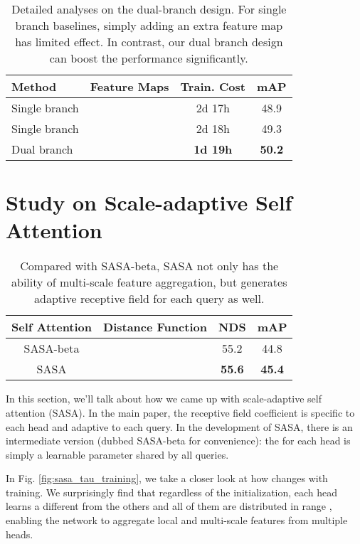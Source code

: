 \documentclass[10pt,twocolumn,letterpaper]{article}
\begin{document}
\begin{table}[t]
  \centering
  \begin{tabular}{l|c|c|c}
     \toprule
     Method & Feature Maps & Train. Cost & mAP \\
     \midrule
     Single branch &  & 2d 17h & 48.9 \\
     Single branch &  & 2d 18h & 49.3 \\
     Dual branch &  & \textbf{1d 19h} & \textbf{50.2} \\
     \bottomrule
  \end{tabular}
  \caption{Detailed analyses on the dual-branch design. For single branch baselines, simply adding an extra  feature map has limited effect. In contrast, our dual branch design can boost the performance significantly.}
  \label{table:dual_branch_c6}
\end{table}  

\section{Study on Scale-adaptive Self Attention}

\begin{table}[t]
  \centering
  \begin{tabular}{c|c|cc}
    \toprule
    Self Attention & Distance Function & NDS & mAP \\
    \midrule
    SASA-beta &  & 55.2 & 44.8 \\
    SASA      &  & \textbf{55.6} & \textbf{45.4} \\
    \bottomrule
  \end{tabular}
  \caption{Compared with SASA-beta, SASA not only has the ability of multi-scale feature aggregation, but generates adaptive receptive field for each query as well.}
  \label{table:sasa_beta}
\end{table}

In this section, we'll talk about how we came up with scale-adaptive self attention (SASA).
In the main paper, the receptive field coefficient  is specific to each head and adaptive to each query. In the development of SASA, there is an intermediate version (dubbed SASA-beta for convenience): the  for each head is simply a learnable parameter shared by all queries. 

In Fig. \ref{fig:sasa_tau_training}, we take a closer look at how  changes with training. We surprisingly find that regardless of the initialization, each head learns a different  from the others and all of them are distributed in range , enabling the network to aggregate local and multi-scale features from multiple heads.
\end{document}
